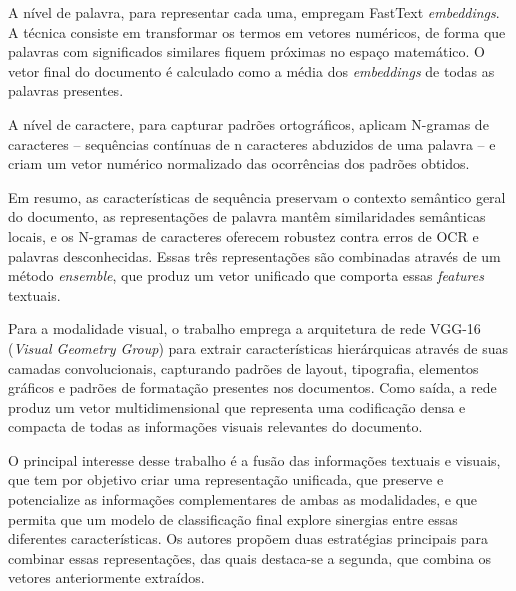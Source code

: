 A nível de palavra, para representar cada uma, empregam FastText \textit{embeddings}. A técnica consiste em transformar os termos em vetores numéricos, de forma que palavras com significados similares fiquem próximas no espaço matemático. O vetor final do documento é calculado como a média dos \textit{embeddings} de todas as palavras presentes.

A nível de caractere, para capturar padrões ortográficos, aplicam N-gramas de caracteres -- sequências contínuas de n caracteres abduzidos de uma palavra -- e criam um vetor numérico normalizado das ocorrências dos padrões obtidos.

Em resumo, as características de sequência preservam o contexto semântico geral do documento, as representações de palavra mantêm similaridades semânticas locais, e os N-gramas de caracteres oferecem robustez contra erros de OCR e palavras desconhecidas. Essas três representações são combinadas através de um método \textit{ensemble}, que produz um vetor unificado que comporta essas \textit{features} textuais.

Para a modalidade visual, o trabalho emprega a arquitetura de rede VGG-16 (\textit{Visual Geometry Group}) para extrair características hierárquicas através de suas camadas convolucionais, capturando padrões de layout, tipografia, elementos gráficos e padrões de formatação presentes nos documentos. Como saída, a rede produz um vetor multidimensional que representa uma codificação densa e compacta de todas as informações visuais relevantes do documento.

O principal interesse desse trabalho é a fusão das informações textuais e visuais, que tem por objetivo criar uma representação unificada, que preserve e potencialize as informações complementares de ambas as modalidades, e que permita que um modelo de classificação final explore sinergias entre essas diferentes características. Os autores propõem duas estratégias principais para combinar essas representações, das quais destaca-se a segunda, que combina os vetores anteriormente extraídos.

